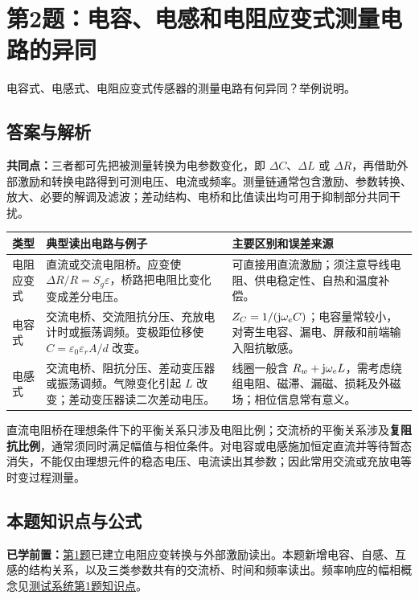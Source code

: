 \section{第2题：电容、电感和电阻应变式测量电路的异同}
\label{hw:4-2}
\begin{hwquestion}
电容式、电感式、电阻应变式传感器的测量电路有何异同？举例说明。
\end{hwquestion}

\subsection*{答案与解析}
\textbf{共同点：}三者都可先把被测量转换为电参数变化，即 $\Delta C$、$\Delta L$ 或 $\Delta R$，再借助外部激励和转换电路得到可测电压、电流或频率。测量链通常包含激励、参数转换、放大、必要的解调及滤波；差动结构、电桥和比值读出均可用于抑制部分共同干扰。

\begin{center}
\small
\begin{tabularx}{\linewidth}{@{}p{1.6cm} X X@{}}
\toprule
类型 & 典型读出电路与例子 & 主要区别和误差来源 \\
\midrule
电阻应变式 & 直流或交流电阻桥。应变使 $\Delta R/R=S_g\varepsilon$，桥路把电阻比变化变成差分电压。 & 可直接用直流激励；须注意导线电阻、供电稳定性、自热和温度补偿。 \\
电容式 & 交流电桥、交流阻抗分压、充放电计时或振荡调频。变极距位移使 $C=\varepsilon_0\varepsilon_r A/d$ 改变。 & $Z_C=1/(\mathrm{j}\omega_e C)$；电容量常较小，对寄生电容、漏电、屏蔽和前端输入阻抗敏感。 \\
电感式 & 交流电桥、阻抗分压、差动变压器或振荡调频。气隙变化引起 $L$ 改变；差动变压器读二次差动电压。 & 线圈一般含 $R_w+\mathrm{j}\omega_e L$，需考虑绕组电阻、磁滞、漏磁、损耗及外磁场；相位信息常有意义。 \\
\bottomrule
\end{tabularx}
\end{center}

直流电阻桥在理想条件下的平衡关系只涉及电阻比例；交流桥的平衡关系涉及\textbf{复阻抗比例}，通常须同时满足幅值与相位条件。对电容或电感施加恒定直流并等待暂态消失，不能仅由理想元件的稳态电压、电流读出其参数；因此常用交流或充放电等时变过程测量。

\subsection*{本题知识点与公式}\label{kn:4-2}
\noindent\textbf{已学前置：}\hyperref[kn:4-1]{第1题}已建立电阻应变转换与外部激励读出。本题新增电容、自感、互感的结构关系，以及三类参数共有的交流桥、时间和频率读出。频率响应的幅相概念见\hyperref[kn:3-1]{测试系统第1题知识点}。

